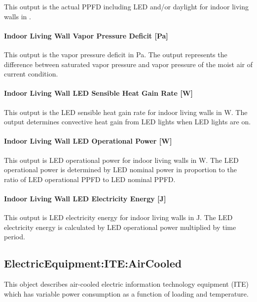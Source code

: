 This output is the actual PPFD including LED and/or daylight for indoor living walls in \si{\umolperAreaperSecond}.

\paragraph{Indoor Living Wall Vapor Pressure Deficit {[}Pa{]}}\label{indoor-living-wall-vpd-pa}

This output is the vapor pressure deficit in Pa. The output represents the difference between saturated vapor pressure and vapor pressure of the moist air of current condition.

\paragraph{Indoor Living Wall LED Sensible Heat Gain Rate {[}W{]}}\label{indoor-living-wall-led-sensible-heat-gain-rate-w}

This output is the LED sensible heat gain rate for indoor living walls in W. The output determines convective heat gain from LED lights when LED lights are on.

\paragraph{Indoor Living Wall LED Operational Power {[}W{]}}\label{indoor-living-wall-led-operational-power-w}

This output is LED operational power for indoor living walls in W. The LED operational power is determined by LED nominal power in proportion to the ratio of LED operational PPFD to LED nominal PPFD.

\paragraph{Indoor Living Wall LED Electricity Energy {[}J{]}}\label{indoor-living-wall-led-electricity-energy-j}

This output is LED electricity energy for indoor living walls in J. The LED electricity energy is calculated by LED operational power multiplied by time period.

\subsection{ElectricEquipment:ITE:AirCooled}\label{electricequipmentiteaircooled}

This object describes air-cooled electric information technology equipment (ITE) which has variable power consumption as a function of loading and temperature.

